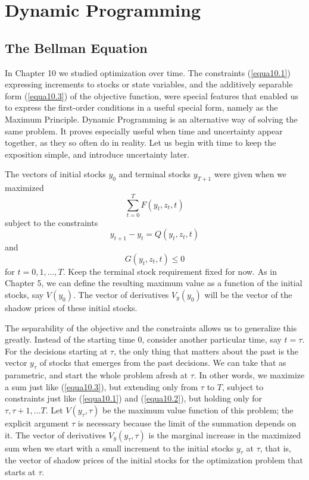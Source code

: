 \chapter{Dynamic Programming}

\section*{The Bellman Equation}

In Chapter 10 we studied optimization over time. The constraints (\ref{equa10.1}) expressing increments to stocks or state variables, and the additively separable form (\ref{equa10.3}) of the objective function, were special features that enabled us to express the first-order conditions in a useful special form, namely as the Maximum Principle. Dynamic Programming is an alternative way of solving the same problem. It proves especially useful when time and uncertainty appear together, as they so often do in reality. Let us begin with time to keep the exposition simple, and introduce uncertainty later.

The vectors of initial stocks $y_0$ and terminal stocks $y_{T+1}$ were given when we maximized
\begin{equation*}  \tag{10.3}
\sum\limits_{t=0}^T F(y_t, z_t, t)
\end{equation*}
subject to the constraints 
\begin{equation*}  \tag{10.1}
 y_{t+1} - y_t = Q(y_t, z_t, t)
\end{equation*}
and
\begin{equation*}  \tag{10.2}
  G(y_t, z_t, t) \leq 0
\end{equation*}
for $t=0,1,\dots, T$. Keep the terminal stock requirement fixed for now. As in Chapter 5, we can define the resulting maximum value as a function of the initial stocks, say $V(y_0)$. The vector of derivatives $V_y(y_0)$ will be the vector of the shadow prices of these initial stocks.

The separability of the objective and the constraints allows us to generalize this greatly. Instead of the starting time 0, consider another particular time, say $t = \tau$. For the decisions starting at $\tau$, the only thing that matters about the past is the vector $y_\tau$ of stocks that emerges from the past decisions. We can take that as parametric, and start the whole problem afresh at $\tau$. In other words, we maximize a sum just like (\ref{equa10.3}), but extending only from $\tau$ to $T$, subject to constraints just like (\ref{equa10.1}) and (\ref{equa10.2}), but holding only for $\tau, \tau + 1, \dots T$. Let $V(y_\tau, \tau)$ be the maximum value function of this problem; the explicit argument $\tau$ is necessary because the limit of the summation depends on it. The vector of derivatives $V_y(y_\tau, \tau)$ is the marginal increase in the maximized sum when we start with a small increment to the initial stocks $y_\tau$ at $\tau$, that is, the vector of shadow prices of the initial stocks for the optimization problem that starts at $\tau$.


